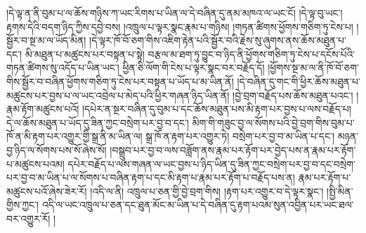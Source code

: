 །དེ་ལྟ་ན་ནི་བུམ་པ་ལ་ཆོས་གཉིས་ཀ་ཡང་རིགས་པ་ཡིན་ལ་དེ་བཞིན་དུ་ནམ་མཁའ་ལ་ཡང་ངོ། །དེ་ལྟ་བུ་ཡང་། རྟགས་དེའི་བདག་ཉིད་ཀྱིས་དབྱེ་བས། །འཁྲུལ་པ་ལྟར་སྣང་རྣམ་པ་གཉིས། །གཏན་ཚིགས་ཕྱོགས་གཅིག་ཏུ་ངེས་པ། །སྦྱོར་བ་སྔ་མ་ལ་ཡོད་མིན། །དེ་ལྟར་ཁོ་བོ་ཅག་གིས་འཇིག་རྟེན་པའི་སྦྱོར་བའི་རྗེས་སུ་ཞུགས་ནས་ཆོས་མཐུན་པ་དང་། མི་མཐུན་པ་མཚུངས་པར་བསྟན་པ་སྟེ། བརྩལ་མ་ཐག་ཏུ་བྱུང་བ་ཉིད་ནི་ཕྱོགས་གཅིག་ཏུ་ངེས་པ་དངོས་པོའི་གཏན་ཚིགས་སུ་འདོད་པ་ཡིན་ཡང་། ཕྱིན་ཅི་ལོག་གི་ངེས་པ་ལྟར་སྣང་བར་བརྗོད་དོ། །ཕྱོགས་སྔ་མ་ལ་ནི་ཁོ་བོ་ཅག་གིས་སྦྱོར་བ་བཞིན་ཕྱོགས་གཅིག་ཏུ་ངེས་པར་བསྟན་པ་ཡོད་པ་མ་ཡིན་ནོ། །དེ་བཞིན་དུ་གང་གི་ཕྱིར་ཆོས་མཐུན་པ་མཚུངས་པར་བྱས་པ་ལ་ཡང་འབྲེལ་པ་མེད་པའི་ཕྱིར་གཞན་ཉིད་ཡིན་ནོ། །བྱེ་བྲག་བརྗོད་པས་ཆོས་མཐུན་པའང་། །རྣམ་རྟོག་མཚུངས་པའོ། །དཔེར་ན་སྔར་བཞིན་དུ་བུམ་པ་དང་ཆོས་མཐུན་པས་མི་རྟག་པར་བྱས་པ་ལས་བརྗོད་པ། དེ་ལ་ཆོས་མཐུན་པ་ཡོད་དུ་ཟིན་ཀྱང་བསྲེག་པར་བྱ་བ་དང་། མིག་གི་གཟུང་བྱ་ལ་སོགས་པའི་བྱེ་བྲག་གིས་བུམ་པ་ཁོ་ན་མི་རྟག་པར་འགྱུར་གྱི་སྒྲ་ནི་མ་ཡིན་ལ། སྒྲ་ཁོ་ན་རྟག་པར་འགྱུར་ཏེ། བསྲེག་པར་བྱ་བ་མ་ཡིན་པ་དང་། མཉན་བྱ་ཉིད་ལ་སོགས་པས་སོ་ཞེས་སོ། །བསྒྲུབ་པར་བྱ་བ་ལས་བཟློག་ནས་རྣམ་པར་རྟོག་པར་བྱེད་པས་ན་རྣམ་པར་རྟོག་པ་མཚུངས་པའམ། དཔེར་བརྗོད་པ་ལས་གཞན་ལ་ཡང་བྱས་པ་ཉིད་ཡིན་དུ་ཟིན་ཀྱང་བསྲེག་པར་བྱ་བ་དང་བསྲེག་པར་བྱ་བ་མ་ཡིན་པ་ལ་སོགས་པ་བཞིན་རྟག་པ་དང་མི་རྟག་པ་རྣམ་པར་རྟོག་པ་བརྗོད་པས་ན། རྣམ་པར་རྟོག་པ་མཚུངས་པའོ་ཞེས་ཟེར་རོ། །འདི་ལ་ནི། འཁྲུལ་པ་ཅན་གྱི་བྱེ་བྲག་གིས། །རྟག་པར་འགྱུར་བ་དེ་ལྟར་སྣང་། །སྤྱི་མིན་གྱིས་ཀྱང་། འདི་ལ་ཡང་འཁྲུལ་པ་ཅན་དང་ཐུན་མོང་མ་ཡིན་པ་དེ་བཞིན་དུ་རྟག་པའམ་སུན་འབྱིན་པར་ཡང་ཐལ་བར་འགྱུར་རོ། །
